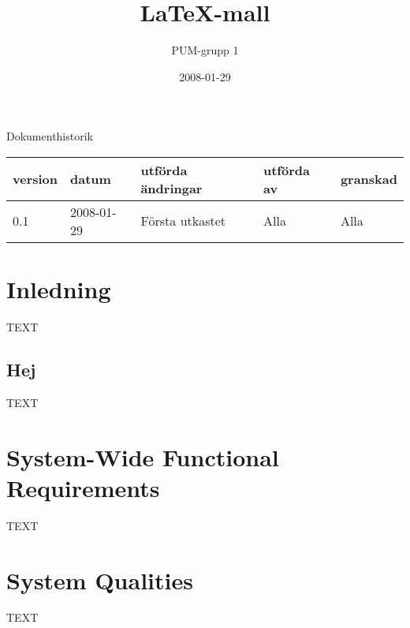 

\ifpdf
\else
\fi

\title{LaTeX-mall}
\author{PUM-grupp 1}
\date{2008-01-29}



\maketitle\thispagestyle{empty}

\newpage

{\centering \Large{Dokumenthistorik\\}}

\vspace{10pt}
\begin{tabularx}{\textwidth}{ |l|l|X|l|l| }
  \hline
    \textbf{version} & \textbf{datum} & \textbf{utförda ändringar} & \textbf{utförda av} & \textbf{granskad} \\
	\hline 
  0.1 & 2008-01-29 &  Första utkastet  & Alla & Alla   \\
  \hline
\end{tabularx}

\newpage

\setcounter{tocdepth}{2}
\tableofcontents
\newpage

\section{Inledning}

TEXT

\subsection{Hej}

TEXT

\section{System-Wide Functional Requirements}

TEXT

\section{System Qualities}

TEXT

